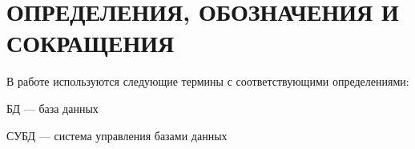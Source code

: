 \section*{\large ОПРЕДЕЛЕНИЯ, ОБОЗНАЧЕНИЯ И СОКРАЩЕНИЯ}
В работе используются следующие термины с соответствующими определениями:

БД --- база данных

СУБД --- система управления базами данных

\pagebreak